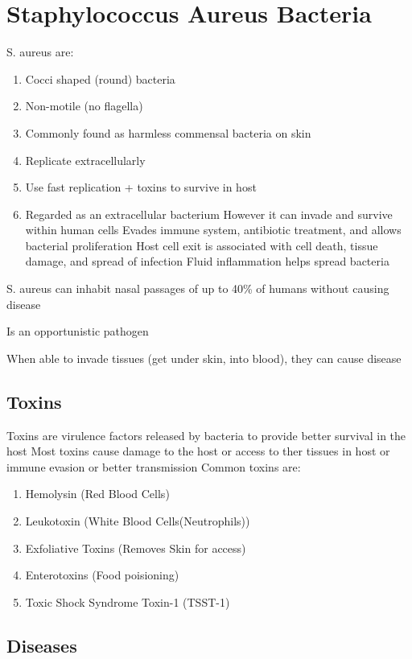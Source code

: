 \documentclass{notes}
\begin{document}
\section*{Staphylococcus Aureus Bacteria}
S. aureus are:
\begin{enumerate}
    \item Cocci shaped (round) bacteria
    \item Non-motile (no flagella)
    \item Commonly found as harmless commensal bacteria on skin
    \item Replicate extracellularly
    \item Use fast replication + toxins to survive in host
    \item Regarded as an extracellular bacterium
    \subitem However it can invade and survive within human cells
    \subsubitem Evades immune system, antibiotic treatment, and allows bacterial proliferation
    \subsubitem Host cell exit is associated with cell death, tissue damage, and spread of infection
    \subsubitem Fluid inflammation helps spread bacteria
\end{enumerate}

S. aureus can inhabit nasal passages of up to 40\% of humans without causing disease

Is an opportunistic pathogen

\tab \indicates When able to invade tissues (get under skin, into blood), they can cause disease

\subsection*{Toxins}
Toxins are virulence factors released by bacteria to provide better survival in the host
Most toxins cause damage to the host or access to ther tissues in host or immune evasion or better transmission
Common toxins are:
\begin{enumerate}
    \item Hemolysin (Red Blood Cells)
    \item Leukotoxin (White Blood Cells(Neutrophils))
    \item Exfoliative Toxins (Removes Skin for access)
    \item Enterotoxins (Food poisioning)
    \item Toxic Shock Syndrome Toxin-1 (TSST-1)
\end{enumerate}

\subsection*{Diseases}
\end{document}
